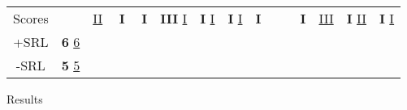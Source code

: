 \begin{landscape}
{{\begin{tabular}{llccc|ccc|ccc|ccc|ccc|ccc}
      \multicolumn{1}{c}{Scores}                   &    & \multicolumn{1}{c|}{\underline{II}}          & \multicolumn{2}{c|}{\textbf{I}}                                   & \multicolumn{1}{c|}{\textbf{I}}     & \multicolumn{2}{c|}{\textbf{III} \underline{I}}                                    & \multicolumn{1}{c|}{\textbf{I} \underline{I}} & \multicolumn{2}{c|}{\textbf{I} \underline{I}}                      & \multicolumn{1}{c|}{\textbf{I}}             & \multicolumn{2}{c|}{}                                           & \multicolumn{1}{c|}{\textbf{I}}              & \multicolumn{2}{c|}{\underline{III}}                                           & \multicolumn{1}{c|}{\textbf{I} \underline{II}} & \multicolumn{2}{c}{\textbf{I} \underline{I}}                               \\ \cline{1-2}
      \multicolumn{1}{c}{+SRL}                     & \textbf{6} \underline{6} \\
      \multicolumn{1}{c}{-SRL}                     & \textbf{5} \underline{5}

      \end{tabular}
    }
  }{Results}
  \vfill
\end{landscape}


